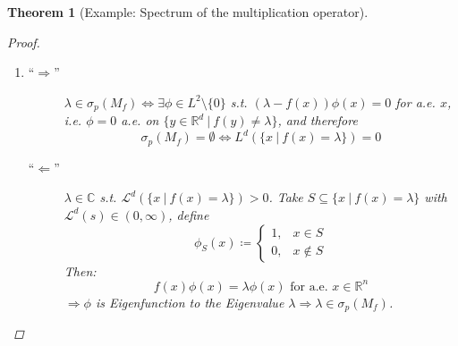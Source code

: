 \documentclass[12pt]{extreport} %
\newcommand{\C}{\mathbb{C}}
\newcommand{\N}{\mathbb{N}}
\newcommand{\R}{\mathbb{R}}
\theoremstyle{named}
\theoremstyle{nnamed}
\theoremstyle{itshape}
\newtheorem{theorem}{Theorem}  \counterwithin{theorem}{chapter}
\theoremstyle{normal}
\begin{document}
\begin{theorem}[Example: Spectrum of the multiplication operator]
\begin{proof}
\begin{enumerate}[label=(\roman*\upshape)]
\begin{description}
				$\Rightarrow$ If $\lambda \in \rho(M_f)$, but then
				$$ \left\| \left( \lambda - M_f \right)^{-1} \right\|_{L(L^2)} \geq \frac{\left\| \left( \lambda - M_f \right)^{-1} \left( \lambda - M_f \right) \phi_m \right\|_{L^2}}{\left\| \left( \lambda - M_f \right) \phi_m \right\|_{L^2}} \geq 2^{2m} \quad \forall m \in \N $$
				$\Rightarrow \lambda \in \sigma(M_f)$.
		   \end{description}
		\item \begin{description}
			\item[\enquote{$\Rightarrow$}] $\lambda \in \sigma_p(M_f) \iff \exists \phi \in L^2 \setminus \{ 0 \}$ s.t. $\left( \lambda - f(x) \right) \phi(x) = 0$ for a.e. $x$, i.e. $\phi = 0$ a.e. on $\{ y \in \R^d ~|~ f(y) \neq \lambda \}$, and therefore
				$$ \sigma_p(M_f) = \emptyset \iff L^d \left( \{ x ~|~f(x) = \lambda \} \right) = 0 $$
			\item[\enquote{$\Leftarrow$}] $\lambda \in \C$ s.t. $\mathcal{L}^d \left( \{ x ~|~f(x) = \lambda \} \right) > 0$. Take $S \subseteq \{ x ~|~f(x) = \lambda \}$ with $\mathcal{L}^d(s) \in (0, \infty)$, define
				$$ \phi_S(x) \coloneqq \begin{cases} 1, & x \in S \\ 0, & x \notin S \end{cases} $$
				Then:
					$$ f(x) \phi(x) = \lambda \phi(x) \text{ for a.e. } x \in \R^n $$
				$\Rightarrow \phi$ is Eigenfunction to the Eigenvalue $\lambda \Rightarrow \lambda \in \sigma_p(M_f)$.
		   \end{description}			
	  \end{enumerate}
	\end{proof}
\end{theorem}
\end{document}
